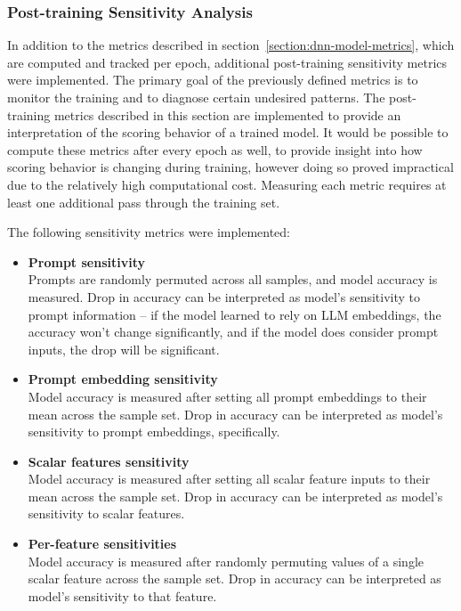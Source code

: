 \documentclass[a4paper,11pt,twoside]{report}
\theoremstyle{definition}
\begin{document}
\subsubsection{Post-training Sensitivity Analysis}

In addition to the metrics described in section~\ref{section:dnn-model-metrics}, which are computed and tracked per epoch, additional post-training sensitivity metrics were implemented. The primary goal of the previously defined metrics is to monitor the training and to diagnose certain undesired patterns. The post-training metrics described in this section are implemented to provide an interpretation of the scoring behavior of a trained model. It would be possible to compute these metrics after every epoch as well, to provide insight into how scoring behavior is changing during training, however doing so proved impractical due to the relatively high computational cost. Measuring each metric requires at least one additional pass through the training set.

The following sensitivity metrics were implemented:

\begin{itemize}
    \item \textbf{Prompt sensitivity} \\
    Prompts are randomly permuted across all samples, and model accuracy is measured. Drop in accuracy can be interpreted as model's sensitivity to prompt information -- if the model learned to rely on LLM embeddings, the accuracy won't change significantly, and if the model does consider prompt inputs, the drop will be significant.
    \item \textbf{Prompt embedding sensitivity} \\
    Model accuracy is measured after setting all prompt embeddings to their mean across the sample set. Drop in accuracy can be interpreted as model's sensitivity to prompt embeddings, specifically.
    \item \textbf{Scalar features sensitivity} \\
    Model accuracy is measured after setting all scalar feature inputs to their mean across the sample set. Drop in accuracy can be interpreted as model's sensitivity to scalar features.
    \item \textbf{Per-feature sensitivities} \\
    Model accuracy is measured after randomly permuting values of a single scalar feature across the sample set. Drop in accuracy can be interpreted as model's sensitivity to that feature.
\end{itemize}
\end{document}
